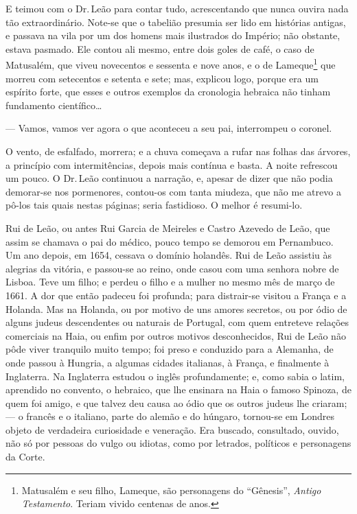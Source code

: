 E teimou com o Dr.\,Leão para contar tudo, acrescentando que nunca ouvira
nada tão extraordinário. Note-se que o tabelião presumia ser lido em
histórias antigas, e passava na vila por um dos homens mais ilustrados
do Império; não obstante, estava pasmado. Ele contou ali mesmo, entre
dois goles de café, o caso de Matusalém, que viveu novecentos e sessenta
e nove anos, e o de Lameque\footnote{Matusalém e seu filho, Lameque, são
  personagens do ``Gênesis'', \emph{Antigo Testamento}. Teriam vivido
  centenas de anos.} que morreu com setecentos e setenta e sete; mas,
explicou logo, porque era um espírito forte, que esses e outros exemplos
da cronologia hebraica não tinham fundamento científico\ldots{}

--- Vamos, vamos ver agora o que aconteceu a seu pai, interrompeu o
coronel.

O vento, de esfalfado, morrera; e a chuva começava a rufar nas folhas
das árvores, a princípio com intermitências, depois mais contínua e
basta. A noite refrescou um pouco. O Dr.\,Leão continuou a narração, e,
apesar de dizer que não podia demorar-se nos pormenores, contou-os com
tanta miudeza, que não me atrevo a pô-los tais quais nestas páginas;
seria fastidioso. O melhor é resumi-lo.

Rui de Leão, ou antes Rui Garcia de Meireles e Castro Azevedo de Leão,
que assim se chamava o pai do médico, pouco tempo se demorou em
Pernambuco. Um ano depois, em 1654, cessava o domínio holandês. Rui de
Leão assistiu às alegrias da vitória, e passou-se ao reino, onde casou
com uma senhora nobre de Lisboa. Teve um filho; e perdeu o filho e a
mulher no mesmo mês de março de 1661. A dor que então padeceu foi
profunda; para distrair-se visitou a França e a Holanda. Mas na Holanda,
ou por motivo de uns amores secretos, ou por ódio de alguns judeus
descendentes ou naturais de Portugal, com quem entreteve relações
comerciais na Haia, ou enfim por outros motivos desconhecidos, Rui de
Leão não pôde viver tranquilo muito tempo; foi preso e conduzido para a
Alemanha, de onde passou à Hungria, a algumas cidades italianas, à
França, e finalmente à Inglaterra. Na Inglaterra estudou o inglês
profundamente; e, como sabia o latim, aprendido no convento, o hebraico,
que lhe ensinara na Haia o famoso Spinoza, de quem foi amigo, e que
talvez deu causa ao ódio que os outros judeus lhe criaram; --- o francês
e o italiano, parte do alemão e do húngaro, tornou-se em Londres objeto
de verdadeira curiosidade e veneração. Era buscado, consultado, ouvido,
não só por pessoas do vulgo ou idiotas, como por letrados, políticos e
personagens da Corte.

